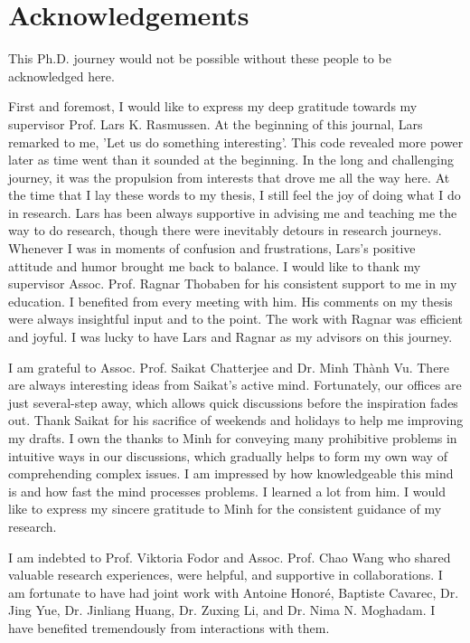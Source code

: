 \chapter{Acknowledgements}
This Ph.D. journey would not be possible without these people to be acknowledged here.

First and foremost, I would like to express my deep gratitude towards my supervisor Prof. Lars K. Rasmussen. At the beginning of this journal, Lars remarked to me, 'Let us do something interesting'. This code revealed more power later as time went than it sounded at the beginning. In the long and challenging journey, it was the propulsion from interests that drove me all the way here. At the time that I lay these words to my thesis, I still feel the joy of doing what I do in research. Lars has been always supportive in advising me and teaching me the way to do research, though there were inevitably detours in research journeys. Whenever I was in moments of confusion and frustrations, Lars's positive attitude and humor brought me back to balance.
I would like to thank my supervisor Assoc. Prof. Ragnar Thobaben for his consistent support to me in my education. I benefited from every meeting with him. His comments on my thesis were always insightful input and to the point. The work with Ragnar was efficient and joyful. I was lucky to have Lars and Ragnar as my advisors on this journey.

I am grateful to Assoc. Prof. Saikat Chatterjee and Dr. Minh Th\`{a}nh Vu. There are always interesting ideas from Saikat's active mind. Fortunately, our offices are just several-step away, which allows quick discussions before the inspiration fades out. Thank Saikat for his sacrifice of weekends and holidays to help me improving my drafts.
I own the thanks to Minh for conveying many prohibitive problems in intuitive ways in our discussions, which gradually helps to form my own way of comprehending complex issues. I am impressed by how knowledgeable this mind is and how fast the mind processes problems. I learned a lot from him. I would like to express my sincere gratitude to Minh for the consistent guidance of my research.

I am indebted to Prof. Viktoria Fodor and Assoc. Prof. Chao Wang who shared valuable research experiences, were helpful, and supportive in collaborations. I am fortunate to have had joint work with Antoine Honor{\'e}, Baptiste Cavarec, Dr. Jing Yue, Dr. Jinliang Huang, Dr. Zuxing Li, and Dr. Nima N. Moghadam. I have benefited tremendously from interactions with them.

